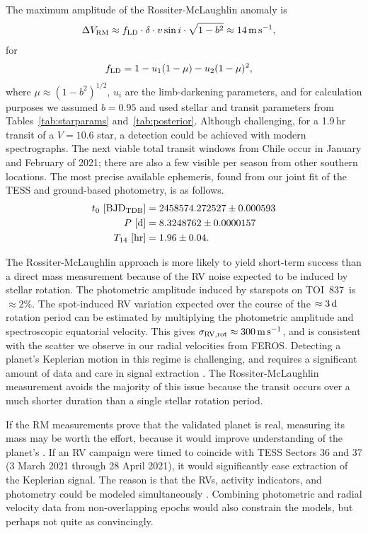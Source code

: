 \documentclass[12pt,twocolumn,tighten]{aastex63}
\newcommand{\tn}{TOI~837} %
\begin{document}
The maximum amplitude of the Rossiter-McLaughlin anomaly is
\citep{gaudi_prospects_2007}
\begin{align}
  \Delta V_{\rm RM} &\approx f_{\rm LD} \cdot \delta \cdot v\sin i \cdot \sqrt{1-b^2}
  \approx 14\,{\rm m\,s}^{-1},
\end{align}
for
\begin{align}
  f_{\rm LD} &= 1 - u_1 ( 1 - \mu ) - u_2 (1 - \mu )^2,
\end{align}
where $\mu \approx (1 - b^2)^{1/2}$, $u_i$ are the limb-darkening
parameters, and for calculation purposes we
assumed $b=0.95$ and used stellar and transit parameters from
Tables~\ref{tab:starparams} and~\ref{tab:posterior}.  Although
challenging, for a 1.9$\,$hr transit of a $V=10.6$ star, a detection
could be achieved with modern spectrographs.  The next viable total
transit windows from Chile occur in January and February of 2021;
there are also a few visible per season from other southern locations.
The most precise available ephemeris, found from our joint fit of the
TESS and ground-based photometry, is as follows.
\begin{align}
  t_0\ [{\rm BJD_{TDB}}] &= 2458574.272527 \pm 0.000593 \nonumber \\
  P\ [{\rm d}] &= 8.3248762 \pm 0.0000157 \nonumber \\
  T_{14}\ [{\rm hr}] &= 1.96 \pm 0.04.
  \label{eq:ephem}
\end{align}

The Rossiter-McLaughlin approach is more likely to yield short-term
success than a direct mass measurement because of the RV noise
expected to be induced by stellar rotation.  The photometric amplitude
induced by starspots on \tn\ is $\approx 2\%$.  The spot-induced RV
variation expected over the course of the $\approx 3\,{\rm d}$
rotation period can be estimated by multiplying the photometric
amplitude and spectroscopic equatorial velocity.  This gives
$\sigma_{\rm RV,rot} \approx 300\,{\rm m\,s}^{-1}$, and is consistent
with the scatter we observe in our radial velocities from FEROS.
Detecting a planet's Keplerian motion in this regime is challenging,
and requires a significant amount of data and care in signal
extraction \citep{barragan_radial_2019}.  The Rossiter-McLaughlin
measurement avoids the majority of this issue because the transit
occurs over a much shorter duration than a single stellar rotation
period.  

If the RM measurements prove that the validated planet is real,
measuring its mass may be worth the effort, because it would improve
understanding of the planet's .  If
an RV campaign were timed to coincide with TESS Sectors 36 and 37 (3
March 2021 through 28 April 2021), it would significantly ease
extraction of the Keplerian signal.  The reason is that the RVs,
activity indicators, and photometry could be modeled simultaneously
\citep[{\it e.g.},][]{aigrain_simple_2012,rajpaul_gaussian_2015}.
Combining photometric and radial velocity data from non-overlapping
epochs would also constrain the models, but perhaps not quite as
convincingly.
\end{document}

